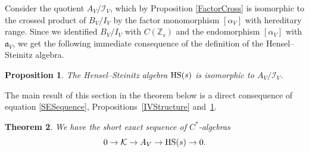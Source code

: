 \documentclass[pdftex]{sigma}
\newcommand{\Z}{{\mathbb Z}}
\numberwithin{equation}{section}
\newtheorem{Theorem}{Theorem}[section]
\newtheorem{Proposition}[Theorem]{Proposition}
 { \theoremstyle{definition}
\newtheorem{Definition}[Theorem]{Definition}
\newtheorem{Note}[Theorem]{Note}
\newtheorem{Example}[Theorem]{Example}
\newtheorem{Remark}[Theorem]{Remark} }
\begin{document}
Consider the quotient $A_V/\mathcal{I}_V$, which by Proposition \ref{FactorCross} is isomorphic to the crossed product of $B_V/I_V$ by the factor monomorphism $[\alpha_V]$ with hereditary range. Since we identified $B_V/I_V$ with $C(\Z_s)$ and the endomorphism $[\alpha_V]$ with $\mathfrak{a}_V$, we get the following immediate consequence of the definition of the Hensel--Steinitz algebra.

\begin{Proposition}\label{VAlgebraQuotient}
The Hensel--Steinitz algebra ${\rm HS}(s)$ is isomorphic to $A_V/\mathcal{I}_V$.
\end{Proposition}

The main result of this section in the theorem below is a direct consequence of equation \eqref{SESequence}, Propositions~\ref{IVStructure} and~\ref{VAlgebraQuotient}.
\begin{Theorem}
We have the short exact sequence of $C^*$-algebras
\begin{equation}\label{AVExact}
0 \to\mathcal{K} \to A_V \to {\rm HS}(s) \to 0 .
\end{equation}
\end{Theorem}
\end{document}
